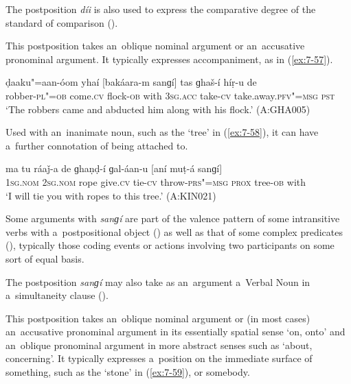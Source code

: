The postposition \textit{díi} is also used to express the comparative degree of the standard of comparison ().



 This postposition takes an~oblique nominal argument or an~accusative pronominal argument. It typically expresses accompaniment, as in (\ref{ex:7-57}).

\begin{exe}
\ex
\label{ex:7-57}
\gll ḍaaku"=aan-óom yhaí [bakáara-m sanɡí] tas ɡhaš-í híṛ-u de \\
robber-\textsc{pl"=ob} come.\textsc{cv} flock-\textsc{ob}  with \textsc{3sg.acc} take-\textsc{cv} take.away.\textsc{pfv"=msg} \textsc{pst} \\
\glt `The robbers came and abducted him along with his flock.' (A:GHA005)
\end{exe}

Used with an~inanimate noun, such as the `tree' in (\ref{ex:7-58}), it can have a~further connotation of being attached to.

\begin{exe}
\ex
\label{ex:7-58}
\gll ma tu ráaǰ-a de ɡhaṇḍ-í ɡal-áan-u [aní muṭ-á sanɡí] \\
\textsc{1sg.nom} \textsc{2sg.nom} rope give.\textsc{cv} tie-\textsc{cv} throw-\textsc{prs"=msg} \textsc{prox} tree-\textsc{ob} with \\
\glt `I will tie you with ropes to this tree.' (A:KIN021)
\end{exe}

Some arguments with \textit{sanɡí} are part of the valence pattern of some intransitive verbs with a~postpositional object () as well as that of some complex predicates (), typically those coding events or actions involving two participants on some sort of equal basis.


The postposition \textit{sanɡí} may also take as an~argument a~Verbal Noun in a~simultaneity clause ().


 This postposition takes an~oblique nominal argument or (in most cases) an~accusative pronominal argument in its essentially spatial sense `on, onto' and an~oblique pronominal argument in more abstract senses such as `about, concerning'. It typically expresses a~position on the immediate surface of something, such as the `stone' in (\ref{ex:7-59}), or somebody.

